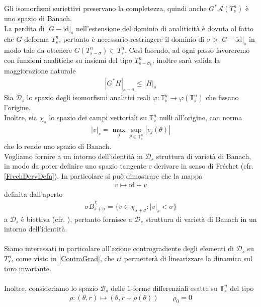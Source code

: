 \documentclass[twoside, 11pt]{amsbook}
\newcommand{\0}{{(0)}}
\newcommand{\3}{{(3)}}
\theoremstyle{colonplain}
\theoremstyle{colondefinition}
\theoremstyle{colonremark}
\numberwithin{equation}{chapter}
\begin{document}
Gli isomorfismi suriettivi preservano la completezza, quindi anche $G^*\mathcal{A}(T^n_s)$ è uno spazio di Banach. \\
La perdita di $|G - \mathrm{id}|_s$ nell'estensione del dominio di analiticità è dovuta al fatto che $G$ deforma $T^n_s$, pertanto è necessario restringere il dominio di $\sigma > |G - \mathrm{id}|_s$ in modo tale da ottenere $G(T^n_{s - \sigma}) \subset T^n_s$. Così facendo, ad ogni passo lavoreremo con funzioni analitiche su insiemi del tipo $T^n_{s - \sigma_k}$, inoltre sarà valida la maggiorazione naturale
\begin{align}
    |G^*H|_{s - \sigma} \leq |H|_s
\end{align}
Sia $\mathcal{D}_s$ lo spazio degli isomorfismi analitici reali $\varphi : \mathbb{T}^n_s \longrightarrow \varphi(\mathbb{T}^n_s)$ che fissano l'origine. \\
Inoltre, sia $\chi_s$ lo spazio dei campi vettoriali su $\mathbb{T}^n_s$ nulli all'origine, con norma
\begin{align}
    |v|_s = \max_j \sup_{\theta \in \mathbb{T}^n_s} |v_j(\theta)|
\end{align}
che lo rende uno spazio di Banach. \\
Vogliamo fornire a un intorno dell'identità in $\mathcal{D}_s$ struttura di varietà di Banach, in modo da poter definire uno spazio tangente e derivare in senso di Fréchet (cfr. \ref{FrechDervDefn}). In particolare si può dimostrare che la mappa
\begin{align}
    v \mapsto \mathrm{id} + v
\end{align}
definita dall'aperto
\begin{align}
    \sigma\mathring{B}^\chi_{s + \sigma} = \{v \in \chi_{s + \sigma} : |v|_s < \sigma\}
\end{align}
a $\mathcal{D}_s$ è biettiva (cfr. \cite{Fejoz17}), pertanto fornisce a $\mathcal{D}_s$ struttura di varietà di Banach in un intorno dell'identità. \\ \\
Siamo interessati in particolare all'azione controgradiente degli elementi di $\mathcal{D}_s$ su $T^n_s$, come visto in \eqref{ContraGrad}, che ci permetterà di linearizzare la dinamica sul toro invariante. \\ \\
Inoltre, consideriamo lo spazio $\mathcal{B}_s$ delle $1$-forme differenziali esatte su $\mathbb{T}^n_s$ del tipo
\begin{align}
    \rho : (\theta, r) \mapsto (\theta, r + \rho(\theta)) \qquad \rho_0 = 0
\end{align}
\end{document}
